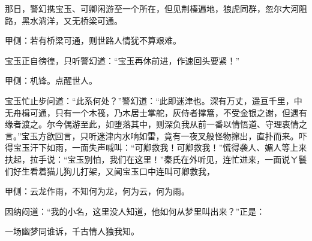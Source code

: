 \begin{parag}


    那日，警幻携宝玉、可卿闲游至一个所在，但见荆榛遍地，狼虎同群，忽尔大河阻路，黑水淌洋，又无桥梁可通。\begin{note}甲侧：若有桥梁可通，则世路人情犹不算艰难。\end{note}宝玉正自徬徨，只听警幻道：“宝玉再休前进，作速回头要紧！”\begin{note}甲侧：机锋。点醒世人。\end{note}宝玉忙止步问道：“此系何处？”警幻道：“此即迷津也。深有万丈，遥亘千里，中无舟楫可通，只有一个木筏，乃木居士掌舵，灰侍者撑篙，不受金银之谢，但遇有缘者渡之。尔今偶游至此，如堕落其中，则深负我从前一番以情悟道、守理衷情之言。”宝玉方欲回言，只听迷津内水响如雷，竟有一夜叉般怪物撺出，直扑而来。吓得宝玉汗下如雨，一面失声喊叫：“可卿救我！可卿救我！”慌得袭人、媚人等上来扶起，拉手说：“宝玉别怕，我们在这里！”秦氏在外听见，连忙进来，一面说ㄚ鬟们好生看着猫儿狗儿打架，又闻宝玉口中连叫可卿救我，\begin{note}甲侧：云龙作雨，不知何为龙，何为云，何为雨。\end{note}因纳闷道：“我的小名，这里没人知道，他如何从梦里叫出来？”正是：
\end{parag}

\begin{poem}
    \begin{pl}一场幽梦同谁诉，千古情人独我知。\end{pl}
\end{poem}

